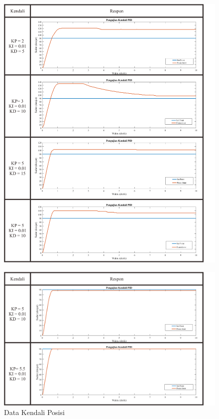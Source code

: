 \begin{figure}[H]
	\centering
		\includegraphics[width=\textwidth,height=\textheight,keepaspectratio]{gambar/kendali2.png}
\end{figure}

\begin{figure}[H]
	\centering
		\includegraphics[width=\textwidth,height=\textheight,keepaspectratio]{gambar/kendali3.png}
	\caption{Data Kendali Posisi}
	\label{pic.kendali}
\end{figure}

